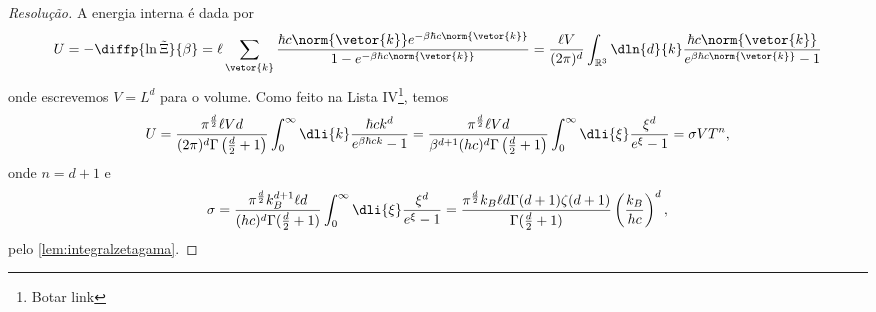 \begin{proof}[Resolução]
    A energia interna é dada por
    \begin{equation*}
        U = - \diffp{\ln \tilde\Xi}{\beta} = \ell \sum_{\vetor{k}} \frac{\hbar c \norm{\vetor{k}} e^{-\beta \hbar c \norm{\vetor{k}}}}{1 - e^{-\beta \hbar c \norm{\vetor{k}}}} = \frac{\ell V}{(2\pi)^d} \int_{\mathbb{R}^3}\dln{d}{k} \frac{\hbar c \norm{\vetor{k}}}{e^{\beta \hbar c \norm{\vetor{k}}}-1}
    \end{equation*}
    onde escrevemos \(V = L^d\) para o volume. Como feito na Lista IV\footnote{Botar link}, temos
    \begin{equation*}
        U = \frac{\pi^{\frac{d}{2}}\ell Vd}{(2\pi)^d \Gamma\left(\frac{d}{2} + 1\right)} \int_0^\infty \dli{k} \frac{\hbar c k^d}{e^{\beta \hbar c k}-1} = \frac{\pi^{\frac{d}{2}} \ell V d}{\beta^{d + 1}(h c)^d \Gamma\left(\frac{d}{2} + 1\right)} \int_0^\infty \dli{\xi} \frac{\xi^d}{e^\xi - 1} = \sigma V T^{n},
    \end{equation*}
    onde \(n = d + 1\) e
    \begin{equation*}
        \sigma = \frac{\pi^{\frac{d}{2}} k_B^{d + 1}\ell d}{(hc)^d \Gamma(\frac{d}{2} + 1)}\int_0^\infty \dli{\xi} \frac{\xi^d}{e^{\xi} - 1} = \frac{\pi^{\frac{d}{2}}k_B \ell d \Gamma(d + 1) \zeta(d + 1)}{\Gamma(\frac{d}{2} + 1)} \left(\frac{k_B}{hc}\right)^d,
    \end{equation*}
    pelo \cref{lem:integralzetagama}.
\end{proof}
